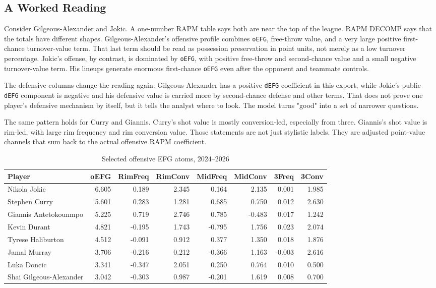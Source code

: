 \documentclass[11pt]{article}
\begin{document}
\subsection{A Worked Reading}

Consider Gilgeous-Alexander and Jokic.  A one-number RAPM table says both are
near the top of the league.  RAPM DECOMP says that the totals have different
shapes.  Gilgeous-Alexander's offensive profile combines \texttt{oEFG},
free-throw value, and a very large positive first-chance turnover-value term.
That last term should be read as possession preservation in point units, not
merely as a low turnover percentage.  Jokic's offense, by contrast, is dominated
by \texttt{oEFG}, with positive free-throw and second-chance value and a small
negative turnover-value term.  His lineups generate enormous first-chance
\texttt{oEFG} even after the opponent and teammate controls.

The defensive columns change the reading again.  Gilgeous-Alexander has a
positive \texttt{dEFG} coefficient in this export, while Jokic's public
\texttt{dEFG} component is negative and his defensive value is carried more by
second-chance defense and other terms.  That does not prove one player's
defensive mechanism by itself, but it tells the analyst where to look.  The
model turns "good" into a set of narrower questions.

The same pattern holds for Curry and Giannis.  Curry's shot value is mostly
conversion-led, especially from three.  Giannis's shot value is rim-led, with
large rim frequency and rim conversion value.  Those statements are not just
stylistic labels.  They are adjusted point-value channels that sum back to the
actual offensive RAPM coefficient.

\begin{table}[h]
\centering
\caption{Selected offensive EFG atoms, 2024--2026}
\label{tab:offshot}
\begin{tabular}{lrrrrrrr}
\toprule
Player & oEFG & RimFreq & RimConv & MidFreq & MidConv & 3Freq & 3Conv\\
\midrule
Nikola Jokic & 6.605 & 0.189 & 2.345 & 0.164 & 2.135 & 0.001 & 1.985\\
Stephen Curry & 5.601 & 0.283 & 1.281 & 0.685 & 0.750 & 0.012 & 2.630\\
Giannis Antetokounmpo & 5.225 & 0.719 & 2.746 & 0.785 & -0.483 & 0.017 & 1.242\\
Kevin Durant & 4.821 & -0.195 & 1.743 & -0.795 & 1.756 & 0.023 & 2.074\\
Tyrese Haliburton & 4.512 & -0.091 & 0.912 & 0.377 & 1.350 & 0.018 & 1.876\\
Jamal Murray & 3.706 & -0.216 & 0.212 & -0.366 & 1.163 & -0.003 & 2.616\\
Luka Doncic & 3.341 & -0.347 & 2.051 & 0.250 & 0.764 & 0.010 & 0.500\\
Shai Gilgeous-Alexander & 3.042 & -0.303 & 0.987 & -0.201 & 1.619 & 0.008 & 0.700\\
\bottomrule
\end{tabular}
\end{table}
\end{document}
